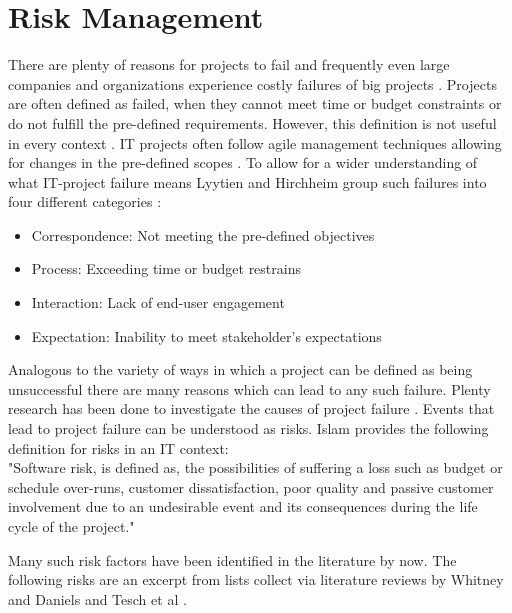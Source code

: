 \section{Risk Management}
\label{sec:theoryA}

There are plenty of reasons for projects to fail and frequently even large companies and organizations experience costly failures of big projects \cite{dwivediResearchInformationSystems2015}. Projects are often defined as failed, when they cannot meet time or budget constraints or do not fulfill the pre-defined requirements. However, this definition is not useful in every context \cite{debakkerDoesRiskManagement2010}. IT projects often follow agile management techniques allowing for changes in the pre-defined scopes \cite{kusay-merkleAgilesProjektmanagementIm2018}. To allow for a wider understanding of what IT-project failure means Lyytien and Hirchheim group such failures into four different categories \cite{lyytinenInformationSystemsFailures1988}: 
\begin{itemize}
	\item Correspondence: Not meeting the pre-defined objectives
	\item Process: Exceeding time or budget restrains
	\item Interaction: Lack of end-user engagement
	\item Expectation: Inability to meet stakeholder's expectations
\end{itemize}	
Analogous to the variety of ways in which a project can be defined as being unsuccessful there are many reasons which can lead to any such failure. Plenty research has been done to investigate the causes of project failure \cite{guptaSystematicLiteratureReview2018}.  Events that lead to project failure can be understood as risks. Islam \cite{islamSoftwareDevelopmentRisk2011} provides the following definition for risks in an IT context:\\
"Software risk, is defined as, the possibilities of suffering a loss such as budget or schedule over-runs, customer dissatisfaction, poor quality and passive customer involvement due to an undesirable event and its consequences during the life cycle of the project."

Many such risk factors have been identified in the literature by now. The following risks are an excerpt from lists collect via literature reviews by Whitney and Daniels \cite{whitneyRootCauseFailure2013} and Tesch et al \cite{teschITProjectRisk2007}. 

